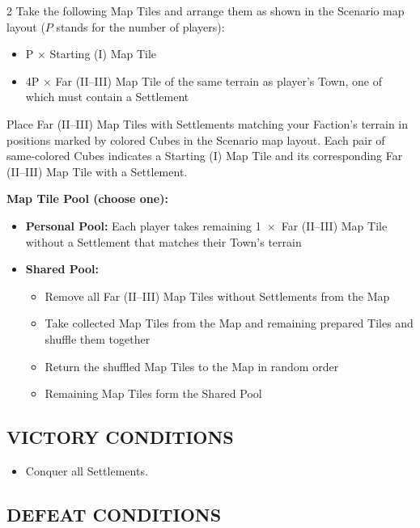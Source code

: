 \begin{multicols}{2}
Take the following Map Tiles and arrange them as shown in the Scenario map layout ($P$ stands for the number of players):

\begin{itemize}
  \item P × Starting (I) Map Tile
  \item 4P × Far (II--III) Map Tile of the same terrain as player's Town, one of which must contain a Settlement
\end{itemize}

Place Far (II--III) Map Tiles with Settlements matching your Faction's terrain in positions marked by colored Cubes in the Scenario map layout.
Each pair of same-colored Cubes indicates a Starting (I) Map Tile and its corresponding Far (II--III) Map Tile with a Settlement.

\textbf{Map Tile Pool (choose one):}

\begin{itemize}
  \item \textbf{Personal Pool:} Each player takes remaining 1~×~Far (II--III) Map Tile without a Settlement that matches their Town's terrain
  \item \textbf{Shared Pool:}
  \begin{itemize}
    \item Remove all Far (II--III) Map Tiles without Settlements from the Map
    \item Take collected Map Tiles from the Map and remaining prepared Tiles and shuffle them together
    \item Return the shuffled Map Tiles to the Map in random order
    \item Remaining Map Tiles form the Shared Pool
  \end{itemize}
\end{itemize}

\subsection*{\MakeUppercase{Victory Conditions}}

\begin{itemize}
   \item Conquer all Settlements.
\end{itemize}

\subsection*{\MakeUppercase{Defeat Conditions}}


\end{multicols}
